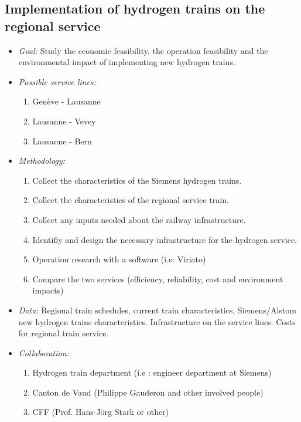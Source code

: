 \documentclass[helv,dvipsnames]{apa7}
\begin{document}
\subsection{Implementation of hydrogen trains on the regional service}
\begin{itemize}
    \itemsep0mm
    \item \textit{Goal:} Study the economic feasibility, the operation feasibility and the environmental impact of implementing new hydrogen trains.
    \item \textit{Possible service lines:}
    \begin{enumerate}
        \itemsep0mm
        \item Genève - Lausanne
        \item Lausanne - Vevey
        \item Lausanne - Bern
    \end{enumerate}
    \item \textit{Methodology:}
    \begin{enumerate}
        \itemsep0mm
        \item Collect the characteristics of the Siemens hydrogen trains.
        \item Collect the characteristics of the regional service train.
        \item Collect any inputs needed about the railway infrastructure.
        \item Identifiy and design the necessary infrastructure for the hydrogen service.
        \item Operation research with a software (i.e: Viriato)
        \item Compare the two services (efficiency, reliability, cost and environment impacts)
    \end{enumerate}
    \item \textit{Data:} Regional train schedules, current train characteristics, Siemens/Alstom new hydrogen trains characteristics. Infrastructure on the service lines. Costs for regional train service. 
    \item \textit{Collaboration:} 
    \begin{enumerate}
        \itemsep 0mm
        \item Hydrogen train department (i.e : engineer department at Siemens)
        \item Canton de Vaud (Philippe Gauderon and other involved people)
        \item CFF (Prof. Hans-Jörg Stark or other)
    \end{enumerate}
\end{itemize}
\newpage
\end{document}
